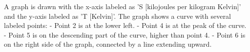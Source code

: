 A graph is drawn with the x-axis labeled as 'S [kilojoules per kilogram Kelvin]' and the y-axis labeled as 'T [Kelvin]'. The graph shows a curve with several labeled points:  
- Point 2 is at the lower left.  
- Point 4 is at the peak of the curve.  
- Point 5 is on the descending part of the curve, higher than point 4.  
- Point 6 is on the right side of the graph, connected by a line extending upward.